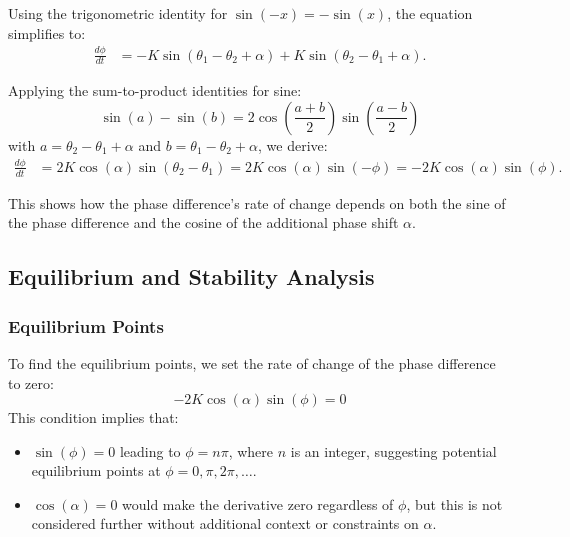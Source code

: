 \documentclass[12pt,a4paper]{article}
\begin{document}
Using the trigonometric identity for \(\sin(-x) = -\sin(x)\), the equation simplifies to:
\begin{align}
    \frac{d\phi}{dt} &= -K \sin(\theta_1 - \theta_2 + \alpha) + K \sin(\theta_2 - \theta_1 + \alpha).
\end{align}

Applying the sum-to-product identities for sine:
\[
\sin(a) - \sin(b) = 2 \cos\left(\frac{a + b}{2}\right) \sin\left(\frac{a - b}{2}\right)
\]
with \(a = \theta_2 - \theta_1 + \alpha\) and \(b = \theta_1 - \theta_2 + \alpha\), we derive:
\begin{align}
    \frac{d\phi}{dt} &= 2K \cos(\alpha) \sin(\theta_2 - \theta_1) = 2K \cos(\alpha) \sin(-\phi) = -2K \cos(\alpha) \sin(\phi).
\end{align}

This shows how the phase difference's rate of change depends on both the sine of the phase difference and the cosine of the additional phase shift \(\alpha\).

\subsection{Equilibrium and Stability Analysis}
\subsubsection{Equilibrium Points}
To find the equilibrium points, we set the rate of change of the phase difference to zero:
\begin{equation}
    -2K \cos(\alpha) \sin(\phi) = 0
\end{equation}
This condition implies that:
\begin{itemize}
    \item \(\sin(\phi) = 0\) leading to \(\phi = n\pi\), where \(n\) is an integer, suggesting potential equilibrium points at \(\phi = 0, \pi, 2\pi, \ldots\).
    \item \(\cos(\alpha) = 0\) would make the derivative zero regardless of \(\phi\), but this is not considered further without additional context or constraints on \(\alpha\).
\end{itemize}
\end{document}
